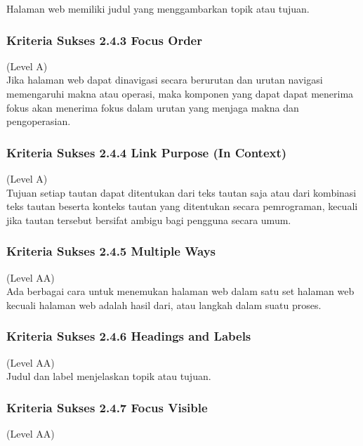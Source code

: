 \documentclass[a4paper,twoside]{article}
\begin{document}
\begin{enumerate}
		Halaman web memiliki judul yang menggambarkan topik atau tujuan.
		
		\subsubsection*{Kriteria Sukses 2.4.3 Focus Order}
		\label{subsubsec:kriteria_2.4.3}
		(Level A) \\
		
		Jika halaman web dapat dinavigasi secara berurutan dan urutan navigasi memengaruhi makna atau operasi, maka komponen yang dapat dapat menerima fokus akan menerima fokus dalam urutan yang menjaga makna dan pengoperasian.
		
		\subsubsection*{Kriteria Sukses 2.4.4 Link Purpose (In Context)}
		\label{subsubsec:kriteria_2.4.4}
		(Level A) \\
		
		Tujuan setiap tautan dapat ditentukan dari teks tautan saja atau dari kombinasi teks tautan beserta konteks tautan yang ditentukan secara pemrograman, kecuali jika tautan tersebut bersifat ambigu bagi pengguna secara umum.
		
		\subsubsection*{Kriteria Sukses 2.4.5 Multiple Ways}
		\label{subsubsec:kriteria_2.4.5}
		(Level AA) \\
		
		Ada berbagai cara untuk menemukan halaman web dalam satu set halaman web kecuali halaman web adalah hasil dari, atau langkah dalam suatu proses.
		
		\subsubsection*{Kriteria Sukses 2.4.6 Headings and Labels}
		\label{subsubsec:kriteria_2.4.6}
		(Level AA) \\
		
		Judul dan label menjelaskan topik atau tujuan.
		
		\subsubsection*{Kriteria Sukses 2.4.7 Focus Visible}
		\label{subsubsec:kriteria_2.4.7}
		(Level AA) \\
		

\end{enumerate}
\end{document}
